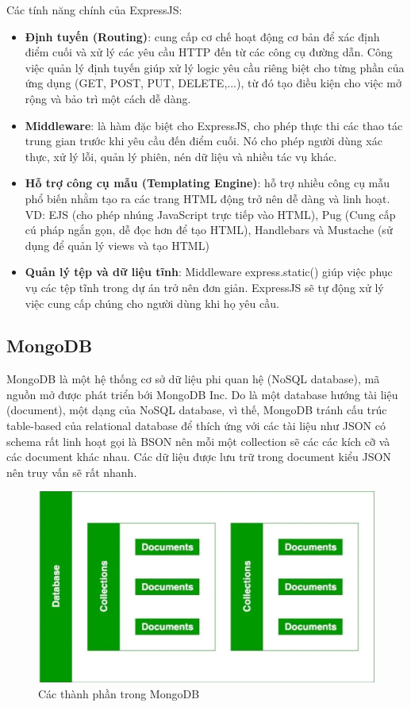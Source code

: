 Các tính năng chính của ExpressJS:
\begin{itemize}
    \item \textbf{Định tuyến (Routing)}: cung cấp cơ chế hoạt động cơ bản để xác định điểm cuối và xử lý các yêu cầu HTTP đến từ các công cụ đường dẫn. Công việc quản lý định tuyến giúp xử lý logic yêu cầu riêng biệt cho từng phần của ứng dụng (GET, POST, PUT, DELETE,...), từ đó tạo điều kiện cho việc mở rộng và bảo trì một cách dễ dàng.
    \item \textbf{Middleware}: là hàm đặc biệt cho ExpressJS, cho phép thực thi các thao tác trung gian trước khi yêu cầu đến điểm cuối. Nó cho phép người dùng xác thực, xử lý lỗi, quản lý phiên, nén dữ liệu và nhiều tác vụ khác. 
    \item \textbf{Hỗ trợ công cụ mẫu (Templating Engine)}: hỗ trợ nhiều công cụ mẫu phổ biến nhằm tạo ra các trang HTML động trở nên dễ dàng và linh hoạt. VD: EJS (cho phép nhúng JavaScript trực tiếp vào HTML), Pug (Cung cấp cú pháp ngắn gọn, dễ đọc hơn để tạo HTML), Handlebars và Mustache (sử dụng để quản lý views và tạo HTML)
    \item \textbf{Quản lý tệp và dữ liệu tĩnh}: Middleware express.static() giúp việc phục vụ các tệp tĩnh trong dự án trở nên đơn giản. ExpressJS sẽ tự động xử lý việc cung cấp chúng cho người dùng khi họ yêu cầu.
\end{itemize}

\subsection{MongoDB}
MongoDB là một hệ thống cơ sở dữ liệu phi quan hệ (NoSQL database), mã nguồn mở được phát triển bới MongoDB Inc. Do là một database hướng tài liệu (document), một dạng của NoSQL database, vì thế, MongoDB tránh cấu trúc table-based của relational database để thích ứng với các tài liệu như JSON có schema rất linh hoạt gọi là BSON nên mỗi một collection sẽ các các kích cỡ và các document khác nhau. Các dữ liệu được lưu trữ trong document kiểu JSON nên truy vấn sẽ rất nhanh.

\begin{figure}[htp!]
    \centering
    \includegraphics[scale=0.5]{img/MongoDB_work.png}
    \caption{Các thành phần trong MongoDB}
    \label{fig:mongodb}
\end{figure}

